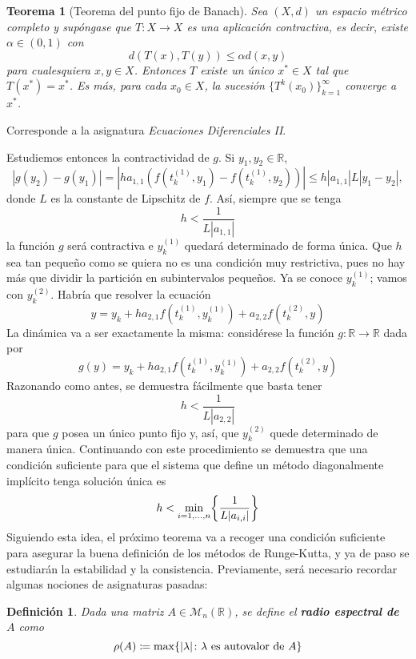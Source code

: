 \documentclass[11pt]{report}
\makeatletter
\renewenvironment{proof}[1][\proofname]{\par
  \pushQED{\qed}%
  \normalfont \topsep\z@skip %
  \trivlist
  \item[\hskip\labelsep
        \itshape
    #1\@addpunct{.}]\ignorespaces
}{%
  \popQED\endtrivlist\@endpefalse
}
\theoremstyle{mytheorem}
\newtheorem{theorem}{Teorema}
\theoremstyle{mydefinition}
\newtheorem{definition}{Definición}
\theoremstyle{myexample}
\let\oldproofname=\proofname
\renewcommand{\proofname}{\rm\bf{\oldproofname}}}
\newenvironment{cdefinition} %
  {\begin{mdframed}[
        linewidth=3pt,
        linecolor=c1,
        bottomline=false,
        topline=false,
        rightline=false,
        innerrightmargin=0pt,
        innertopmargin=0pt,
        innerbottommargin=0pt,
        innerleftmargin=1em, %
        skipabove=\baselineskip]
    \begin{definition}}
  {\end{definition}\end{mdframed}}
\newenvironment{ctheorem} %
  {\begin{mdframed}[
        linewidth=3pt,
        linecolor=c2,
        bottomline=false,
        topline=false,
        rightline=false,
        innerrightmargin=0pt,
        innertopmargin=0pt,
        innerbottommargin=0pt,
        innerleftmargin=1em, %
        skipabove=\baselineskip]
    \begin{theorem}}
  {\end{theorem}\end{mdframed}}
\newcommand{\R}{\mathbb R}
\newcommand{\mybf}[1]{\boldmath\textbf{\color{c1}#1}\unboldmath}
\makeatother
\begin{document}
\begin{ctheorem}[Teorema del punto fijo de Banach]
Sea $(X,d)$ un espacio métrico completo y supóngase que $T \colon X \to X$ es una aplicación contractiva, es decir, existe $\alpha \in (0,1)$ con
\[d(T(x),T(y)) \leq \alpha d(x,y)\]
para cualesquiera $x, y \in X$. Entonces $T$ existe un único $x^* \in X$ tal que $T(x^*) = x^*$. Es más,
para cada $x_0 \in X$, la sucesión $\{T^{k}(x_0)\}_{k=1}^\infty$ converge a $x^*$.
\end{ctheorem}

\begin{proof}
    Corresponde a la asignatura \emph{Ecuaciones Diferenciales II}.
\end{proof}

Estudiemos entonces la contractividad de $g$. Si $y_1,y_2 \in \R$,
\[|g(y_2)-g(y_1)| = |ha_{1,1}(f(t_k^{(1)},y_1)-f(t_k^{(1)},y_2))| \leq h |a_{1,1}| L |y_1-y_2|,\]
donde $L$ es la constante de Lipschitz de $f$. Así, siempre que se tenga
\[h < \frac{1}{L|a_{1,1}|}\]
la función $g$ será contractiva e $y_k^{(1)}$ quedará determinado de forma única. Que $h$ sea tan pequeño como se quiera no es una condición muy restrictiva, pues no hay más que dividir la partición en subintervalos pequeños. Ya se conoce $y_k^{(1)}$; vamos con $y_k^{(2)}$. Habría que resolver la ecuación
\[y = y_k+ha_{2,1}f(t_k^{(1)},y_k^{(1)})+a_{2,2}f(t_k^{(2)},y)\]
La dinámica va a ser exactamente la misma: considérese la función $g \colon \R \to \R$ dada por
\[g(y)=y_k+ha_{2,1}f(t_k^{(1)},y_k^{(1)})+a_{2,2}f(t_k^{(2)},y)\]
Razonando como antes, se demuestra fácilmente que basta tener
\[h < \frac{1}{L|a_{2,2}|}\]
para que $g$ posea un único punto fijo y, así, que $y_k^{(2)}$ quede determinado de manera única. Continuando con este procedimiento se demuestra que una condición suficiente para que el sistema que define un método diagonalmente implícito tenga solución única es
\[h < \min_{i=1,\mathellipsis,n} \biggl\{\frac{1}{L|a_{i,i}|}\biggr\}\]
Siguiendo esta idea, el próximo teorema va a recoger una condición suficiente para asegurar la buena definición de los métodos de Runge-Kutta, y ya de paso se estudiarán la estabilidad y la consistencia. Previamente, será necesario recordar algunas nociones de asignaturas pasadas:

\begin{cdefinition}
Dada una matriz $A \in \mathcal{M}_n(\R)$, se define el \mybf{radio espectral de $A$} como
\[\rho(A) \coloneqq \max\{|\lambda| \colon \lambda \textup{ es autovalor de } A\}\]
\end{cdefinition}
\end{document}

